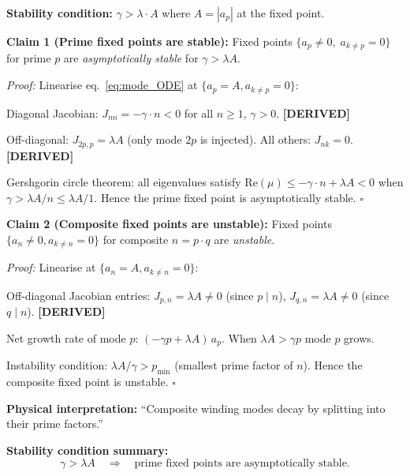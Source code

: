 \bigskip

\begin{tcolorbox}[colback=blue!5!white,colframe=blue!60!black,
  title=Theorem H.1 — Prime Attractor Stability \textmd{[DERIVED — conditional on multiplicative coupling]}]

\textbf{Stability condition:} $\gamma > \lambda \cdot A$ where $A = |a_p|$ at the fixed point.

\medskip
\noindent\textbf{Claim 1 (Prime fixed points are stable):}
Fixed points $\{a_p \neq 0,\; a_{k\neq p} = 0\}$ for prime $p$ are
\emph{asymptotically stable} for $\gamma > \lambda A$.

\medskip
\noindent\textit{Proof:} Linearise eq.~\eqref{eq:mode_ODE} at $\{a_p = A, a_{k\neq p}=0\}$:

\noindent Diagonal Jacobian:
$J_{nn} = -\gamma\cdot n < 0$ for all $n\geq 1$, $\gamma>0$. \textbf{[DERIVED]}

\noindent Off-diagonal: $J_{2p,p} = \lambda A$ (only mode $2p$ is injected).
All others: $J_{nk} = 0$. \textbf{[DERIVED]}

\noindent Gershgorin circle theorem: all eigenvalues satisfy
$\mathrm{Re}(\mu) \leq -\gamma\cdot n + \lambda A < 0$ when $\gamma > \lambda A/n \leq \lambda A/1$.
Hence the prime fixed point is asymptotically stable. $\square$

\medskip
\noindent\textbf{Claim 2 (Composite fixed points are unstable):}
Fixed points $\{a_n \neq 0, a_{k\neq n}=0\}$ for composite $n = p\cdot q$
are \emph{unstable}.

\medskip
\noindent\textit{Proof:} Linearise at $\{a_n = A, a_{k\neq n} = 0\}$:

\noindent Off-diagonal Jacobian entries:
$J_{p,n} = \lambda A \neq 0$ (since $p \mid n$),
$J_{q,n} = \lambda A \neq 0$ (since $q \mid n$). \textbf{[DERIVED]}

\noindent Net growth rate of mode $p$:
$(-\gamma p + \lambda A)\,a_p$. When $\lambda A > \gamma p$ mode $p$ grows.

\noindent Instability condition: $\lambda A/\gamma > p_{\min}$ (smallest prime factor of $n$).
Hence the composite fixed point is unstable. $\square$

\medskip
\noindent\textbf{Physical interpretation:}
``Composite winding modes decay by splitting into their prime factors.''

\medskip
\noindent\textbf{Stability condition summary:}
\begin{equation}
\gamma > \lambda A \quad \Rightarrow \quad \text{prime fixed points are asymptotically stable.}
  \label{eq:stability_condition}
\end{equation}

\end{tcolorbox}

